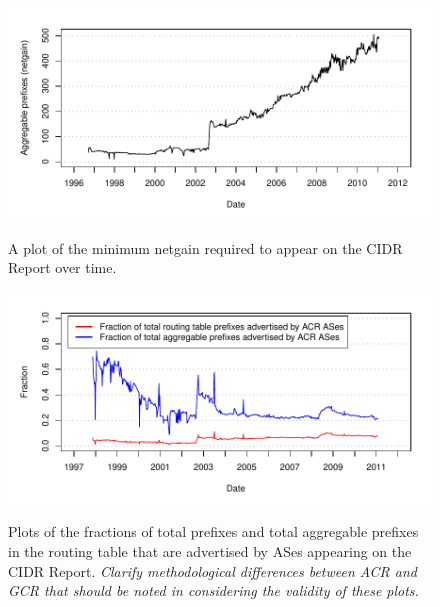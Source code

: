 \begin{figure}[H]
\begin{centering}
    \includegraphics[width=6in]{figures/acr_netgain_time_min.pdf}
    \vspace{-2em}\\
    \caption{A plot of the minimum netgain required to appear on the CIDR Report over time.}
\end{centering}
\end{figure}

\begin{figure}[H]
\begin{centering}
    \includegraphics[width=6in]{figures/acr_gcr_netcompare.pdf}
    \vspace{-2em}\\
    \caption{Plots of the fractions of total prefixes and total aggregable prefixes in the routing table that are advertised by ASes appearing on the CIDR Report. \emph{Clarify methodological differences between ACR and GCR that should be noted in considering the validity of these plots.}}
\end{centering}
\end{figure}


